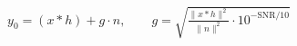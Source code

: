 \documentclass[border=10pt]{standalone}
\begin{document}
$\displaystyle y_0 = (x * h) + g\cdot n,\qquad g = \sqrt{\frac{\lVert x*h\rVert^2}{\lVert n\rVert^2}\cdot 10^{-\mathrm{SNR}/10}}$
\end{document}
